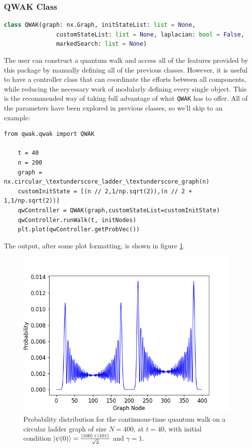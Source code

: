 \documentclass[main.tex]{subfiles}
\begin{document}
\subsubsection{QWAK Class}
\begin{lstlisting}[style=commands,language=Python,mathescape]
    class QWAK(graph: nx.Graph, initStateList: list = None, 
               customStateList: list = None, laplacian: bool = False, 
               markedSearch: list = None)
\end{lstlisting}
The user can construct a quantum walk and access all of the features
provided by this package by manually defining all of the previous classes.
However, it is useful to have a controller class that can coordinate the
efforts between all components, while reducing the necessary work of
modularly defining every single object. This is the recommended way of taking
full advantage of what \texttt{QWAK} has to offer. All of the parameters have
been explored in previous classes, so we'll skip to an example:
\begin{lstlisting}[style=code,escapeinside={__}]
    from qwak.qwak import QWAK

    t = 40
    n = 200
    graph = nx.circular_\textunderscore_ladder_\textunderscore_graph(n)
    customInitState = [(n // 2,1/np.sqrt(2)),(n // 2 + 1,1/np.sqrt(2))]
    qwController = QWAK(graph,customStateList=customInitState)
    qwController.runWalk(t, initNodes)
    plt.plot(qwController.getProbVec())
\end{lstlisting}
The output, after some plot formatting, is shown in figure
\ref{fig:probDistCircLadder}.
\begin{figure}[!h]
    \centering
    \includegraphics[scale=0.50]{img/QWAK/probDistCircLadder.png}
    \caption{Probability distribution for the continuous-time quantum walk on a circular ladder graph of size $N=400$, at $t=40$, with initial condition $\ket{\psi(0)}=\frac{\ket{100}+\ket{101}}{\sqrt{2}}$ and $\gamma=1$.} 
    \label{fig:probDistCircLadder}
\end{figure}
\end{document}
